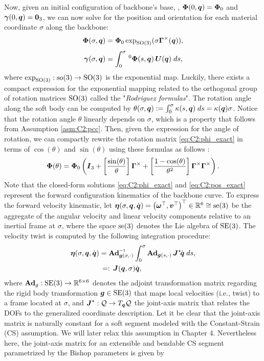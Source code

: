 Now, given an initial configuration of backbone's base, \ie, $\boldsymbol{\Phi}(0,\boldsymbol{q}) = \boldsymbol{\Phi}_0$ and $ {\boldsymbol{\gamma}}(0,{\boldsymbol{q}}) = \boldsymbol{0}_3$, we can now solve for the position and orientation for each material coordinate $\sigma$ along the backbone:
%
\begin{align}
\boldsymbol{\Phi}(\sigma,\boldsymbol{q}) & = \boldsymbol{\Phi}_0\exp_{\textup{\textrm{SO}}(3)}(\sigma \boldsymbol{\Gamma}^\times(\boldsymbol{q})), \label{eq:C2:phi_exact} \\[0.35em]
{\boldsymbol{\gamma}}(\sigma,\boldsymbol{q}) & = \int_0^\sigma\,^0\boldsymbol{\Phi}(s, \boldsymbol{q})\, \boldsymbol{U}(\boldsymbol{q}) \; ds,
\label{eq:C2:pos_exact}
\end{align}
%
where $\exp_{\textup{\textrm{SO}}(3)}: \textup{\textrm{so}}(3) \to \textup{\textrm{SO}}(3)$ is the exponential map. Luckily, there exists a compact expression for the exponential mapping related to the orthogonal group of rotation matrices $\textup{\textrm{SO}}(3)$ called the "\emph{Rodriguez formulas}".  The rotation angle along the soft body can be computed by $\theta(\sigma,{\boldsymbol{q}}) := \int_0^\sigma \kappa(s,{\boldsymbol{q}}) \; ds = \kappa({\boldsymbol{q}}) \sigma$. Notice that the rotation angle $\theta$ linearly depends on $\sigma$, which is a property that follows from Assumption \ref{asm:C2:pcc}. Then, given the expression for the angle of rotation,  we can compactly rewrite the rotation matrix \eqref{eq:C2:phi_exact} in terms of $\cos(\theta)$ and $\sin(\theta)$ using these formulas as follows \cite{Lynch2017}:
%
\begin{equation}
{\boldsymbol{\Phi}}(\theta) = {\boldsymbol{\Phi}}_0 \left( \boldsymbol{I}_3 + \left[ \frac{\sin(\theta)}{\theta} \right]  {\boldsymbol{\Gamma}}^{\times} + \left[ \frac{1-\cos(\theta)}{\theta^2} \right]  {\boldsymbol{\Gamma}}^{\times} {\boldsymbol{\Gamma}}^{\times} \right).
\label{eq:C2:phi_rodr}
\end{equation}
%
Note that the closed-form solutions \eqref{eq:C2:phi_exact} and \eqref{eq:C2:pos_exact} represent the forward configuration kinematics of the backbone curve. To express the forward velocity kinematic, let
${\boldsymbol{\eta}}(\sigma,{\boldsymbol{q}},{\dot{\boldsymbol{q}}}) = \left( \boldsymbol{\omega}^\top, \boldsymbol{v}^\top \right)^\top \in \mathbb{R}^6 \cong \textup{\textrm{se}}(3)$
 be the aggregate of the angular velocity and linear velocity components relative to an inertial frame at $\sigma$, where the space $\textup{\textrm{se}}(3)$ denotes the Lie algebra of $\textup{\textrm{SE}}(3)$. The velocity twist is computed by the following integration procedure:
%
\begin{align}
 \etaB(\sigma,\q,\dq)& = \Ad_{\mat{g}(\sigma,\cdot)}\inv \int_0^\sigma \Ad_{\mat{g}(s,\cdot)}\, \JB^\star\! \dq\;ds, \notag \\ & 
 \,=:\, \JB(\q,\sigma) \dq, \label{eq:C2:vel_cont}
\end{align}
%
where $\textbf{Ad}_g: \textup{\textrm{SE}}(3) \to \mathbb{R}^{6\times 6}$ denotes the adjoint transformation matrix regarding the rigid body transformation ${\boldsymbol{g}} \in \textup{\textrm{SE}}(3)$ that maps local velocities (i.e., twist) to a frame located at $\sigma$, and ${\boldsymbol{J}}^\star:\mathcal{Q} \to T_{{\boldsymbol{q}}}\mathcal{Q}$ the joint-axis matrix that relates the DOFs to the generalized coordinate description. Let it be clear that the joint-axis matrix is naturally constant for a soft segment modeled with the Constant-Strain (CS) assumption. We will later relax this assumption in Chapter 4. Nevertheless here, the joint-axis matrix for an extensible and bendable CS segment parametrized by the Bishop parameters is given by
